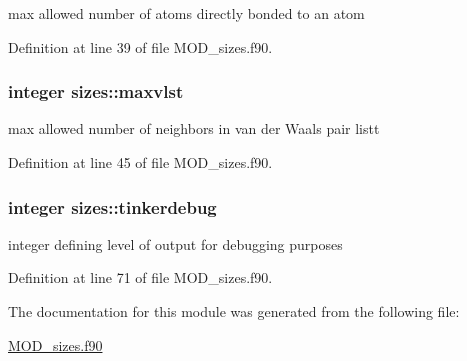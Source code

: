 max allowed number of atoms directly bonded to an atom 



Definition at line 39 of file M\-O\-D\-\_\-sizes.\-f90.

\hypertarget{classsizes_a76b7df25996723eb856ae2da747dc6b1}{
\subsubsection[{maxvlst}]{\setlength{\rightskip}{0pt plus 5cm}integer sizes\-::maxvlst}}\label{classsizes_a76b7df25996723eb856ae2da747dc6b1}


max allowed number of neighbors in van der Waals pair listt 



Definition at line 45 of file M\-O\-D\-\_\-sizes.\-f90.

\hypertarget{classsizes_a8837e11d452843bc5176173e0d6000d0}{
\subsubsection[{tinkerdebug}]{\setlength{\rightskip}{0pt plus 5cm}integer sizes\-::tinkerdebug}}\label{classsizes_a8837e11d452843bc5176173e0d6000d0}


integer defining level of output for debugging purposes 



Definition at line 71 of file M\-O\-D\-\_\-sizes.\-f90.



The documentation for this module was generated from the following file\-:\begin{DoxyCompactItemize}
\item 
\hyperlink{MOD__sizes_8f90}{M\-O\-D\-\_\-sizes.\-f90}\end{DoxyCompactItemize}
